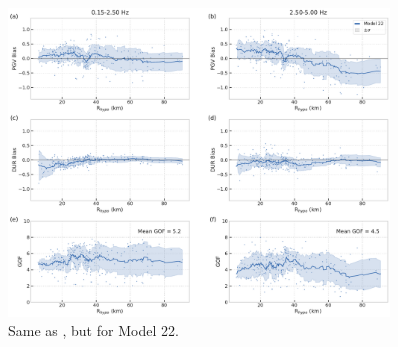 \begin{figure}[!ht]
  \centering
  \includegraphics[width=0.9\textwidth,height=0.9\textheight,keepaspectratio]{figures/figure_highf_S32.pdf}
  \caption{Same as , but for Model 22.
  }
\label{fig:highf-A32}
\end{figure}
\clearpage




\renewcommand{\thesection}{\arabic{chapter}.\arabic{section}}
\renewcommand{\thesubsection}{\thesection.\arabic{subsection}}
\renewcommand{\thetable}{\arabic{table}}
\renewcommand{\thefigure}{\arabic{figure}}










